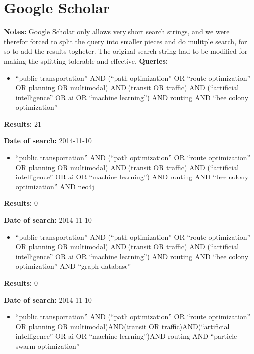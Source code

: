 \section{Google Scholar}
\par \textbf{Notes:} Google Scholar only allows very short search strings, and we were therefor forced to split the query into smaller pieces and do mulitple search, for so to add the results togheter. The original search string had to be modified for making the splitting tolerable and effective. 
\newline
\newline
\textbf{Queries:}
\begin{itemize}
	\item ``public transportation'' AND (``path optimization'' OR ``route optimization'' OR planning OR multimodal) AND (transit OR traffic) AND (``artificial intelligence'' OR ai OR ``machine learning'') AND routing AND ``bee colony optimization''
\end{itemize}
\par \textbf{Results:} 21
\par \textbf{Date of search:} 2014-11-10 
\begin{itemize}
	\item ``public transportation'' AND (``path optimization'' OR ``route optimization'' OR planning OR multimodal) AND (transit OR traffic) AND (``artificial intelligence'' OR ai OR ``machine learning'') AND routing AND ``bee colony optimization'' AND neo4j
\end{itemize}
\par \textbf{Results:} 0
\par \textbf{Date of search:} 2014-11-10
\begin{itemize}
	\item ``public transportation'' AND (``path optimization'' OR ``route optimization'' OR planning OR multimodal) AND (transit OR traffic) AND (``artificial intelligence'' OR ai OR ``machine learning'') AND routing AND ``bee colony optimization'' AND ``graph database''
\end{itemize}
\par \textbf{Results:} 0
\par \textbf{Date of search:} 2014-11-10
\begin{itemize}
	\item ``public transportation'' AND (``path optimization'' OR ``route optimization'' OR planning OR multimodal)AND(transit OR traffic)AND(``artificial intelligence'' OR ai OR ``machine learning'')AND routing AND ``particle swarm optimization''
\end{itemize}

